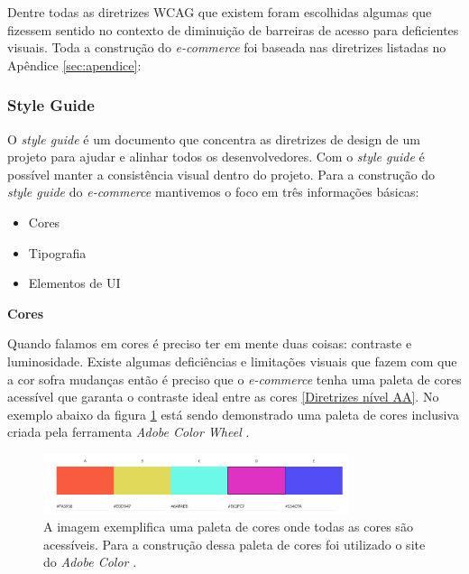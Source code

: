 {Dentre todas as diretrizes WCAG \cite{WCAG21} que existem foram escolhidas algumas que fizessem sentido no contexto de diminuição de barreiras de acesso para deficientes visuais. Toda a construção do \textit{e-commerce} foi baseada nas diretrizes listadas no Apêndice \ref{sec:apendice}: 

}

\newpage
\subsubsection{Style Guide}
{O \textit{style guide} \cite{STYLE} é um documento que concentra as diretrizes de design de um projeto para ajudar e alinhar todos os desenvolvedores. Com o \cite{STYLE}{\textit{style guide}} é possível manter a consistência visual dentro do projeto. Para a construção do \cite{STYLE}{\textit{style guide}} do \textit{e-commerce} mantivemos o foco em três informações básicas:
\begin{itemize}
    \item Cores
    \item Tipografia
    \item Elementos de UI
\end{itemize}

{\centerline{\textbf{Cores}}}
Quando falamos em cores é preciso ter em mente duas coisas: contraste e luminosidade. Existe algumas deficiências e limitações visuais que fazem com que a cor sofra mudanças então é preciso que o \textit{e-commerce} tenha uma paleta de cores acessível que garanta o contraste ideal entre as cores \ref{Diretrizes nível AA}. No exemplo abaixo da figura \ref{fig1:style} está sendo demonstrado uma paleta de cores inclusiva criada pela ferramenta \textit{Adobe Color Wheel} \cite{ADOBE} . 
\begin{figure}[ht]
  		\centering
        \includegraphics[width=0.8\textwidth]{images/paleta_de_cores_acessiveis.png}
        \caption{A imagem exemplifica uma paleta de cores onde todas as cores são acessíveis. Para a construção dessa paleta de cores foi utilizado o site do \textit{Adobe Color} \cite{ADOBE}.}
        \label{fig1:style}
\end{figure}  

}
